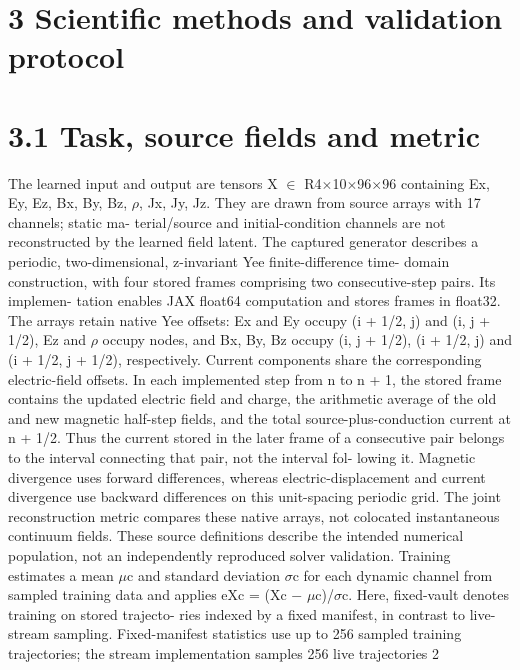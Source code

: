 \documentclass[11pt]{article}
\begin{document}
\section*{3 Scientific methods and validation protocol}


\section*{3.1 Task, source fields and metric}

The learned input and output are tensors X \ensuremath{\in} R4\ensuremath{\times}10\ensuremath{\times}96\ensuremath{\times}96 containing
Ex, Ey, Ez, Bx, By, Bz, \ensuremath{\rho}, Jx, Jy, Jz. They are drawn from source arrays with 17 channels; static ma-
terial/source and initial-condition channels are not reconstructed by the learned field latent. The
captured generator describes a periodic, two-dimensional, z-invariant Yee finite-difference time-
domain construction, with four stored frames comprising two consecutive-step pairs. Its implemen-
tation enables JAX float64 computation and stores frames in float32. The arrays retain native Yee
offsets: Ex and Ey occupy (i + 1/2, j) and (i, j + 1/2), Ez and \ensuremath{\rho} occupy nodes, and Bx, By, Bz
occupy (i, j + 1/2), (i + 1/2, j) and (i + 1/2, j + 1/2), respectively. Current components share the
corresponding electric-field offsets. In each implemented step from n to n + 1, the stored frame
contains the updated electric field and charge, the arithmetic average of the old and new magnetic
half-step fields, and the total source-plus-conduction current at n + 1/2. Thus the current stored in
the later frame of a consecutive pair belongs to the interval connecting that pair, not the interval fol-
lowing it. Magnetic divergence uses forward differences, whereas electric-displacement and current
divergence use backward differences on this unit-spacing periodic grid. The joint reconstruction
metric compares these native arrays, not colocated instantaneous continuum fields. These source
definitions describe the intended numerical population, not an independently reproduced solver
validation.
Training estimates a mean \ensuremath{\mu}c and standard deviation \ensuremath{\sigma}c for each dynamic channel from sampled
training data and applies eXc = (Xc \ensuremath{-} \ensuremath{\mu}c)/\ensuremath{\sigma}c. Here, fixed-vault denotes training on stored trajecto-
ries indexed by a fixed manifest, in contrast to live-stream sampling. Fixed-manifest statistics use
up to 256 sampled training trajectories; the stream implementation samples 256 live trajectories
2
\end{document}
